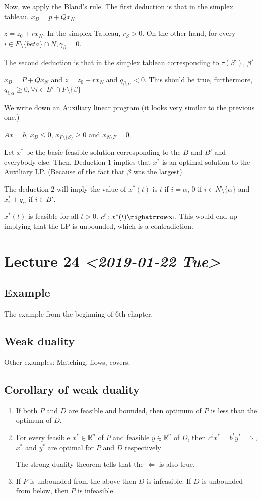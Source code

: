 \documentclass[11pt]{article}
\def\R{\mathbb{R}}
\begin{document}
Now, we apply the Bland's rule. The first deduction is that in the simplex
tableau. \(x_B = p + Q x_N\).

\(z = z_0 + r x_N\). In the simplex Tableau, \(r_\beta > 0\). On the other hand,
for every \(i \in F \setminus \{beta\} \cap N, \gamma_\beta = 0\).

The second deduction is that in the simplex tableau corresponding to
\(\tau(\beta')\), \(\beta'\)

\(x_B = P + Q x_N\) and \(z = z_0 + r x_N\) and \(q_{\beta, \alpha} < 0\). This
should be true, furthermore, \(q_{i, \alpha} \ge 0, \forall i \in B' \cap F
   \setminus \{\beta\}\)

We write down an Auxiliary linear program (it looks very similar to the
previous one.)

\(Ax = b\), \(x_B \le 0\), \(x_{F \setminus \{\beta\}} \ge 0\) and \(x_{N \setminus
   F} = 0\).

Let \(x^{ * }\) be the basic feasible solution corresponding to the \(B\) and \(B'\)
and everybody else. Then, Deduction 1 implies that \(x^{ * }\) is an optimal
solution to the Auxiliary LP. (Because of the fact that \(\beta\) was the largest)

The deduction \(2\) will imply the value of \(x^{ * }(t)\) is \(t\) if \(i =
   \alpha\), \(0\) if \(i \in N \setminus \{\alpha\}\) and \(x_{i}^{ * } + q_{\alpha}\)
if \(i \in B'\).

\(x^{*}(t)\) is feasible for all \(t > 0\). \(c^{t} \colon x^{ * }(t) \righatrrow
   \infty\). This would end up implying that the LP is unbounded, which is a
contradiction.
\section{Lecture 24 \textit{<2019-01-22 Tue>}}
\label{sec:orgb40d2fc}
\subsection{Example}
\label{sec:orge845089}
The example from the beginning of 6th chapter.
\subsection{Weak duality}
\label{sec:org94fa393}
Other examples: Matching, flows, covers.
\subsection{Corollary of weak duality}
\label{sec:orgae7b8c5}
\begin{enumerate}
\item If both \(P\) and \(D\) are feasible and bounded, then optimum of \(P\) is less
than the optimum of \(D\).
\item For every feasible \(x^{*} \in \R^n\) of \(P\) and feasible \(y \in \R^n\) of
\(D\), then \(c^{t} x^{ * } = b^t y^{ * } \implies\), \(x^{ * }\) and \(y^{ * }\)
are optimal for \(P\) and \(D\) respectively

The strong duality theorem tells that the \(\Leftarrow\) is also true.
\item If \(P\) is unbounded from the above then \(D\) is infeasible. If \(D\) is
unbounded from below, then \(P\) is infeasible.
\end{enumerate}
\end{document}
